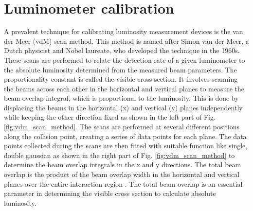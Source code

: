 \chapter{Luminometer calibration}  %

\ifpdf
    \graphicspath{{Chapter3/Figs/Raster/}{Chapter3/Figs/PDF/}{Chapter3/Figs/}}
\else
    \graphicspath{{Chapter3/Figs/Vector/}{Chapter3/Figs/}}
\fi


A prevalent technique for calibrating luminosity measurement devices is the van der Meer (vdM) scan method. This method is named after Simon van der Meer, a Dutch physicist and Nobel laureate, who developed the technique in the 1960s. These scans are performed to relate the detection rate of a given luminometer to the absolute luminosity determined from the measured beam parameters. The proportionality constant is called the visible cross section. It involves scanning the beams across each other in the horizontal and vertical planes to measure the beam overlap integral, which is proportional to the luminosity. %
This is done by displacing the beams in the horizontal (x) and vertical (y) planes independently while keeping the other direction fixed as shown in the left part of Fig. \ref{fig:vdm_scan_method}. The scans are performed at several different positions along the collision point, creating a series of data points for each plane. The data points collected during the scans are then fitted with  suitable function like single, double gaussian as shown in the right part of Fig. \ref{fig:vdm_scan_method}  to determine the beam overlap integrals in the x and y directions. %
The total beam overlap is the product of the beam overlap width in the horizontal and vertical planes over the entire interaction region \cite{vanderMeer1968}. The total beam overlap is an essential parameter in determining the visible cross section to calculate absolute luminosity. 

